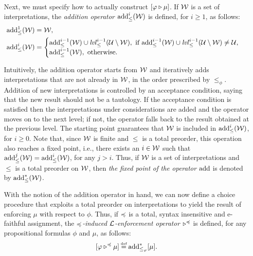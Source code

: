 Next, we must specify how to actually
construct $[\varphi \triangleright \mu]$.
If $\mathcal{W}$ is a set of interpretations, 
the \emph{addition operator ${\operatorname{add}}^i_{\le}(\mathcal{W})$} is defined,
for $i\ge 1$, as follows:
\begin{align*}
{\operatorname{add}}_\le^1(\mathcal{W}) &=\mathcal{W},\\
{\operatorname{add}}_\le^{i}(\mathcal{W}) &= 
\begin{cases}
{\operatorname{add}}_\le^{i-1}(\mathcal{W})\cup\mathit{lvl}_{\le}^{i-1}(\mathcal{U}\setminus\mathcal{W}),~\text{if}~{\operatorname{add}}_\le^{i-1}(\mathcal{W})\cup\mathit{lvl}_{\le}^{i-1}(\mathcal{U}\setminus\mathcal{W})\neq\mathcal{U},\\
{\operatorname{add}}_\le^{i-1}(\mathcal{W}),~\text{otherwise}.
\end{cases}
\end{align*}

Intuitively, the addition operator starts from $\mathcal{W}$
and iteratively adds interpretations that are not already in $\mathcal{W}$,
in the order prescribed by $\le_\phi$.
Addition of new interpretations is 
controlled by an acceptance condition,
saying that the new result should not be a tautology.
If the acceptance condition is satisfied then the 
interpretations under considerations 
are added and the operator moves on
to the next level; if not, the operator 
falls back to the result obtained at the previous level.
The starting point guarantees that $\mathcal{W}$ 
is included in ${\operatorname{add}}_\le^{i}(\mathcal{W})$, for $i\ge 0$.
Note that, since $\mathcal{W}$ is finite and $\le$ is a total preorder, 
this operation also reaches a fixed point,
i.e., there exists an $i\in\mathbb{\mathcal{W}}$ such that
${\operatorname{add}}^j_\le(\mathcal{W})={\operatorname{add}}^i_\le(\mathcal{W})$, for any $j>i$.
Thus, if 
$\mathcal{W}$ is a set of interpretations and $\le$
is a total preorder on $\mathcal{W}$,
then
\emph{the fixed point of the operator ${\operatorname{add}}$} is denoted by
${\operatorname{add}}_\le^\ast(\mathcal{W})$.

With the notion of the addition operator in hand,
we can now define a choice procedure that exploits 
a total preorder on interpretations to yield 
the result of enforcing $\mu$ with respect to $\phi$.
Thus, if $\preccurlyeq$ is a total, syntax insensitive and e-faithful
assignment, 
the \emph{$\preccurlyeq$-induced $\mathcal{L}$-enforcement operator $\triangleright^\preccurlyeq$} is defined,
for any propositional formulas $\phi $ and $\mu$,
as follows:
$$
[\phi\en^\as\mu]\defeq\add^\ast_{\le_\phi}[\mu].
$$


